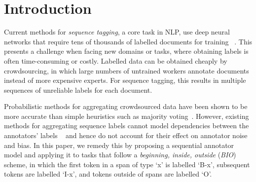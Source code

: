 \section{Introduction}\label{sec:intro}

Current methods for \emph{sequence tagging}, a core task in NLP,
use deep neural networks 
that require
tens of thousands of labelled documents for training %
~\cite{ma2016end,lample2016neural}.
This presents a challenge 
when facing new domains or tasks, where obtaining labels is often time-consuming or costly.
Labelled data can be obtained cheaply by crowdsourcing, in which large
numbers of untrained workers annotate documents instead of more expensive experts.
For sequence tagging, this results in multiple sequences of unreliable labels for each document.

Probabilistic methods for aggregating crowdsourced data
have been shown to be more accurate than simple heuristics 
such as majority voting~\cite{Raykar2010,sheshadri2013square,rodrigues2013learning,hovy2013learning}.
However, existing methods for aggregating sequence labels
cannot model dependencies between the annotators' labels 
~\cite{rodrigues2014sequence,nguyen2017aggregating}
and hence do not account for their effect on annotator noise and bias.
In this paper, we remedy this by proposing a sequential annotator model and applying it to
 tasks that follow a \emph{beginning, inside, outside} (\emph{BIO})
 scheme, 
in which the first token in a span of type `x' is labelled `B-x',  
subsequent tokens are labelled `I-x', 
and tokens outside of spans are labelled `O'.

